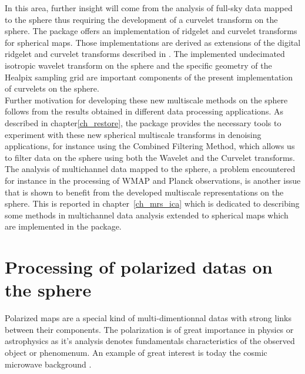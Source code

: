 In this area, further insight will come from the analysis of full-sky data mapped to the sphere thus requiring the development of a curvelet 
transform on the sphere. The \mrs package offers an implementation of ridgelet and curvelet transforms for spherical maps. Those implementations 
are derived as extensions of the digital ridgelet and curvelet transforms described in \cite{starck:sta01_3}. The implemented undecimated isotropic 
wavelet transform on the sphere and the specific geometry of the Healpix sampling grid are important components of the present implementation of 
curvelets on the sphere. \\
 
Further motivation for developing these new multiscale methods on the sphere follows from the results obtained in different data processing applications. 
As described in chapter\ref{ch_restore}, the \mrs package provides the necessary tools to experiment with these new spherical multiscale transforms in 
denoising applications, for instance using the Combined Filtering Method, which allows us to filter data on the sphere using both the Wavelet and the 
Curvelet transforms. The analysis of multichannel data mapped to the sphere, a problem encountered for instance in the processing of WMAP and Planck 
observations, is another issue that is shown to benefit from the developed multiscale representations on the sphere. This is reported in chapter~\ref{ch_mrs_ica} 
which is dedicated to describing some methods in multichannel data analysis extended to spherical maps which are implemented in the \mrs package.  
 
\section{Processing of polarized datas on the sphere}

Polarized maps are a special kind of multi-dimentionnal datas with strong links between their components. The polarization is of great importance 
in physics or astrophysics as it's analysis denotes fundamentals characteristics of the observed object or phenomenum. An example of great interest 
is today the cosmic microwave background \cite{starck}.


